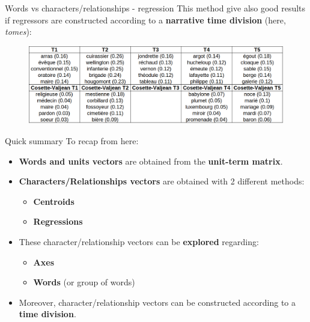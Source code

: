 \documentclass[10pt]{beamer}
\newcommand{\imp}[1]{\textbf{\color{cyan}#1}}
\begin{document}
	
	\begin{frame}{Words vs characters/relationships - regression}
		This method give also good results if regressors are constructed according to a \imp{narrative time division} (here, \emph{tomes}):
		\vspace{-0.2cm}
		\begin{figure}
			\centering
			\includegraphics[width=\textwidth]{img/reg_vs_word_long.png}
		\end{figure}
	\end{frame}
	
	
	\begin{frame}{Quick summary}
		To recap from here:
		\begin{itemize}
			\item \imp{Words and units vectors} are obtained from the \imp{unit-term matrix}.
			\item \imp{Characters/Relationships vectors} are obtained with 2 different methods:
			\begin{itemize}
				\item \imp{Centroids}
				\item \imp{Regressions}
			\end{itemize}
			\item These character/relationship vectors can be \imp{explored} regarding:
			\begin{itemize}
				\item \imp{Axes}
				\item \imp{Words} (or group of words)
			\end{itemize}
			\item Moreover, character/relationship vectors can be constructed according to a \imp{time division}.
		\end{itemize}
	\end{frame}
	
	
\end{document}
